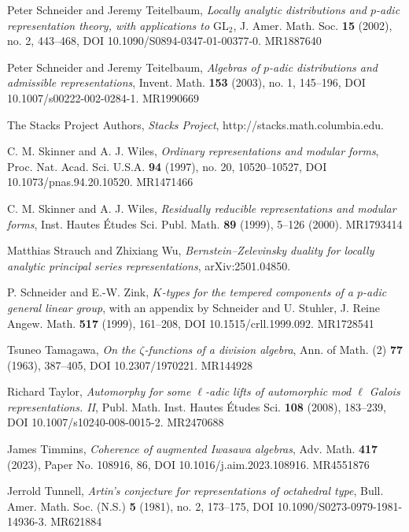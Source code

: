 \item[{[ST02]}] Peter Schneider and Jeremy Teitelbaum, \emph{Locally analytic distributions and $p$-adic representation theory, with applications to $\mathrm{GL}_2$}, J. Amer. Math. Soc. \textbf{15} (2002), no. 2, 443--468, DOI 10.1090/S0894-0347-01-00377-0. MR1887640
\item[{[ST03]}] Peter Schneider and Jeremy Teitelbaum, \emph{Algebras of $p$-adic distributions and admissible representations}, Invent. Math. \textbf{153} (2003), no. 1, 145--196, DOI 10.1007/s00222-002-0284-1. MR1990669
\item[{[Sta]}] The Stacks Project Authors, \emph{Stacks Project}, http://stacks.math.columbia.edu.
\item[{[SW97]}] C. M. Skinner and A. J. Wiles, \emph{Ordinary representations and modular forms}, Proc. Nat. Acad. Sci. U.S.A. \textbf{94} (1997), no. 20, 10520--10527, DOI 10.1073/pnas.94.20.10520. MR1471466
\item[{[SW99]}] C. M. Skinner and A. J. Wiles, \emph{Residually reducible representations and modular forms}, Inst. Hautes \'Etudes Sci. Publ. Math. \textbf{89} (1999), 5--126 (2000). MR1793414
\item[{[SW25]}] Matthias Strauch and Zhixiang Wu, \emph{Bernstein--Zelevinsky duality for locally analytic principal series representations}, arXiv:2501.04850.
\item[{[SZ99]}] P. Schneider and E.-W. Zink, \emph{$K$-types for the tempered components of a $p$-adic general linear group}, with an appendix by Schneider and U. Stuhler, J. Reine Angew. Math. \textbf{517} (1999), 161--208, DOI 10.1515/crll.1999.092. MR1728541
\item[{[Tam63]}] Tsuneo Tamagawa, \emph{On the $\zeta$-functions of a division algebra}, Ann. of Math. (2) \textbf{77} (1963), 387--405, DOI 10.2307/1970221. MR144928
\item[{[Tay08]}] Richard Taylor, \emph{Automorphy for some $\ell$-adic lifts of automorphic mod $\ell$ Galois representations. II}, Publ. Math. Inst. Hautes \'Etudes Sci. \textbf{108} (2008), 183--239, DOI 10.1007/s10240-008-0015-2. MR2470688
\item[{[Tim23]}] James Timmins, \emph{Coherence of augmented Iwasawa algebras}, Adv. Math. \textbf{417} (2023), Paper No. 108916, 86, DOI 10.1016/j.aim.2023.108916. MR4551876
\item[{[Tun81]}] Jerrold Tunnell, \emph{Artin's conjecture for representations of octahedral type}, Bull. Amer. Math. Soc. (N.S.) \textbf{5} (1981), no. 2, 173--175, DOI 10.1090/S0273-0979-1981-14936-3. MR621884
